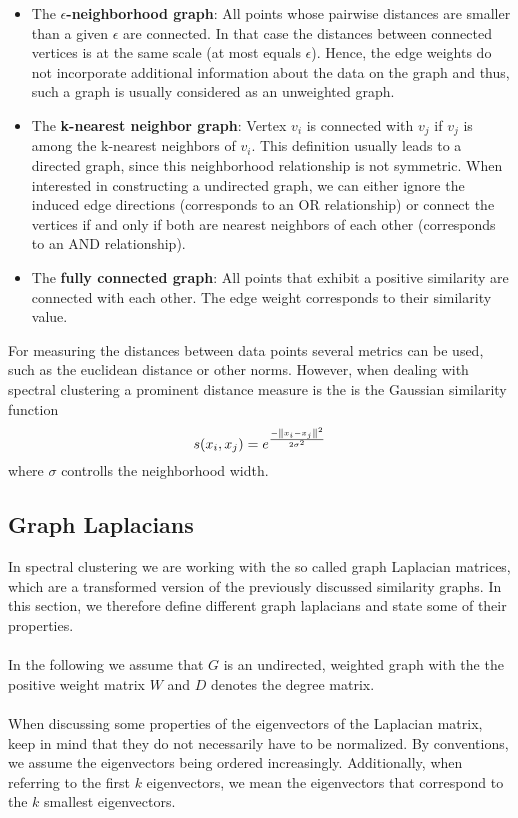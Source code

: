\begin{itemize}
	\item The \textbf{$\epsilon$-neighborhood graph}: All points whose pairwise distances are smaller than a given $\epsilon$ are connected. In that case the distances between connected vertices is at the same scale (at most equals $\epsilon$). Hence, the edge weights do not incorporate additional information about the data on the graph and thus, such a graph is usually considered as an unweighted graph.
	\item The \textbf{k-nearest neighbor graph}: Vertex $v_i$ is connected with $v_j$ if $v_j$ is among the k-nearest neighbors of $v_i$. This definition usually leads to a directed graph, since this neighborhood relationship is not symmetric. When interested in constructing a undirected graph, we can either ignore the induced edge directions (corresponds to an OR relationship) or connect the vertices if and only if both are nearest neighbors of each other (corresponds to an AND relationship).
	\item The \textbf{fully connected graph}: All points that exhibit a positive similarity are connected with each other. The edge weight corresponds to their similarity value.
\end{itemize}
For measuring the distances between data points several metrics can be used, such as the euclidean distance or other norms. However, when dealing with spectral clustering a prominent distance measure is the is the Gaussian similarity function
\begin{equation}
	s(x_i, x_j) = e^{\frac{-\left\lVert x_i - x_j\right\rVert^2 }{2 \sigma^2}} 
\end{equation}
where $\sigma$ controlls the neighborhood width.

\subsection{Graph Laplacians}
In spectral clustering we are working with the so called graph Laplacian matrices, which are a transformed version of the previously discussed similarity graphs. In this section, we therefore define different graph laplacians and state some of their properties. \\ \\
In the following we assume that $G$ is an undirected, weighted graph with the the positive weight matrix $W$ and $D$ denotes the degree matrix. \\ \\
When discussing some properties of the eigenvectors of the Laplacian matrix, keep in mind that they do not necessarily have to be normalized. By conventions, we assume the eigenvectors being ordered increasingly. Additionally, when referring to the first $k$ eigenvectors, we mean the eigenvectors that correspond to the $k$ smallest eigenvectors.

